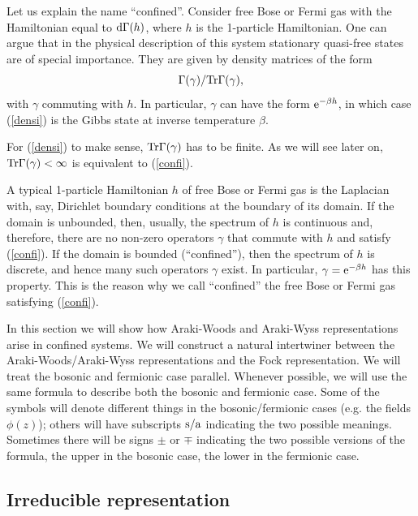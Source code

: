 \documentclass{svmult}
\newcommand{\beq}{\begin{equation}}
\newcommand{\eeq}{\end{equation}}
\def\sa{{\rm s/a}}
\def\Tr{{\rm Tr}}
\def\e{{\rm e}}
\def\d{{\rm d}}
\def\Tr{{\rm Tr}}
\def\e{{\rm e}}
\def\d{{\rm d}}
\begin{document}
Let us explain the name ``confined''.
Consider   free Bose or Fermi gas with the
 Hamiltonian  equal to $\d\Gamma(h)$,
where $h$ is the 1-particle Hamiltonian.
One can argue that in the physical description of this system
stationary quasi-free states are
of special importance. They are
 given by  density matrices  of the form
\beq \Gamma(\gamma)/\Tr\Gamma(\gamma),\label{densi}\eeq
 with $\gamma$ commuting with $h$.
In particular, $\gamma$ can have the form $\e^{-\beta h}$, in which case
(\ref{densi}) is the Gibbs state at inverse temperature $\beta$.

For (\ref{densi}) to make sense,
 $\Tr\Gamma(\gamma)$ has to be finite.
As we will see later on,
$\Tr\Gamma(\gamma)<\infty$ is equivalent to (\ref{confi}).


A typical 1-particle Hamiltonian $h$   of free Bose or Fermi gas is the
Laplacian with, say, Dirichlet boundary conditions at the boundary of its
domain. If the domain is unbounded, then, usually, the spectrum of $h$ is
continuous and, therefore,
there are no non-zero operators  $\gamma$ that commute with $h$ and
satisfy (\ref{confi}).
If the domain is bounded (``confined''), then  the spectrum of $h$ is
discrete, and hence many such operators $\gamma$ exist.
In particular,
 $\gamma=\e^{-\beta h}$ has this property.
This is the reason why we call ``confined''
the free Bose or Fermi gas satisfying (\ref{confi}).

In this section
 we will show how Araki-Woods and Araki-Wyss representations
arise in confined systems.
We will construct a natural intertwiner
between the
 Araki-Woods/Araki-Wyss representations 
and the Fock representation. We will treat the bosonic and fermionic case
 parallel. Whenever possible, we will use the same formula to describe both
 the bosonic and fermionic case. Some of the symbols will denote different
 things  in the bosonic/fermionic 
cases (e.g. the fields $\phi(z)$); others will have subscripts $\sa$
 indicating the two possible meanings.
 Sometimes there will be signs
 $\pm$ or $\mp$ indicating the two possible versions of the formula, the upper
 in  the bosonic case, the lower in the fermionic case.


\subsection{Irreducible representation}
\label{a2.1}
\end{document}

